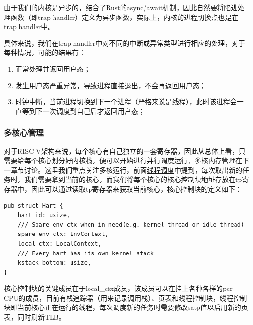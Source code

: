 由于我们的内核是异步的，结合了Rust的async/await机制，因此自然要将陷进处理函数（即trap handler）定义为异步函数，实际上，内核的进程切换点也是在trap handler中。

具体来说，我们在trap handler中对不同的中断或异常类型进行相应的处理，对于每种情况，可能的结果有：
\begin{enumerate}
    \item 正常处理并返回用户态；
    \item 发生用户态严重异常，导致进程直接退出，不会再返回用户态；
    \item 时钟中断，当前进程切换到下一个进程（严格来说是线程），此时该进程会一直等到下一次调度到自己后才返回用户态；
\end{enumerate}

\subsubsection{多核心管理}\label{multiharts}
对于RISC-V架构来说，每个核心有自己独立的一套寄存器，因此从总体上看，只需要给每个核心划分好内核栈，便可以开始进行并行调度运行，多核内存管理在下一章节讨论。这里我们重点关注多核运行，前面\hyperref[schedule]{线程调度}中提到，每次取出新的任务时，我们需要拿到当前的核心，而我们将每个核心的核心控制块地址存放在tp寄存器中，因此可以通过读取tp寄存器来获取当前核心，核心控制块的定义如下：
\begin{tcolorbox}[
title=\textbf{os/src/processor/hart.rs},
listing only,
breakable
]
    \begin{verbatim}
pub struct Hart {
    hart_id: usize,
    /// Spare env ctx when in need(e.g. kernel thread or idle thread)
    spare_env_ctx: EnvContext,
    local_ctx: LocalContext,
    /// Every hart has its own kernel stack
    kstack_bottom: usize,
}
    \end{verbatim}
\end{tcolorbox}
核心控制块的关键成员在于local\_ctx成员，该成员可以在挂上各种各样的per-CPU的成员，目前有栈追踪器（用来记录调用栈）、页表和线程控制块，线程控制块即当前核心正在运行的线程，每次调度新的任务时需要修改satp值以启用新的页表，同时刷新TLB。